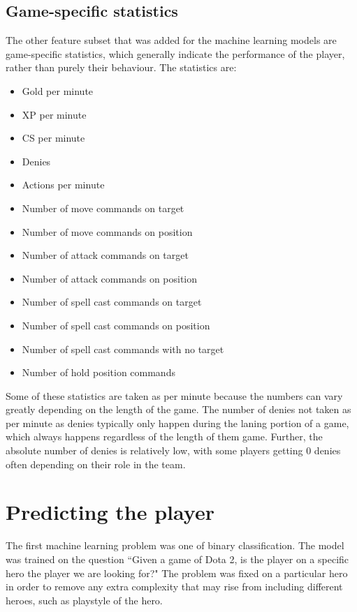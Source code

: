 \documentclass{../sty/SizheArticle}
\begin{document}
\subsection{Game-specific statistics}
The other feature subset that was added for the machine learning models are game-specific statistics, which generally indicate the performance of the player, rather than purely their behaviour. The statistics are:
\begin{itemize}
\item Gold per minute
\item XP per minute
\item CS per minute
\item Denies
\item Actions per minute
\item Number of move commands on target
\item Number of move commands on position
\item Number of attack commands on target
\item Number of attack commands on position
\item Number of spell cast commands on target
\item Number of spell cast commands on position
\item Number of spell cast commands with no target
\item Number of hold position commands
\end{itemize}
Some of these statistics are taken as per minute because the numbers can vary greatly depending on the length of the game. The number of denies not taken as per minute as denies typically only happen during the laning portion of a game, which always happens regardless of the length of them game. Further, the absolute number of denies is relatively low, with some players getting 0 denies often depending on their role in the team.

\section{Predicting the player}
The first machine learning problem was one of binary classification. The model was trained on the question ``Given a game of Dota 2, is the player on a specific hero the player we are looking for?" The problem was fixed on a particular hero in order to remove any extra complexity that may rise from including different heroes, such as playstyle of the hero. 
\end{document}
